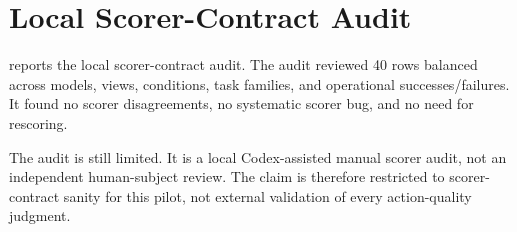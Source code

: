 \section{Local Scorer-Contract Audit}



 reports the local scorer-contract audit. The audit reviewed 40 rows balanced across models, views, conditions, task families, and operational successes/failures. It found no scorer disagreements, no systematic scorer bug, and no need for rescoring.

The audit is still limited. It is a local Codex-assisted manual scorer audit, not an independent human-subject review. The claim is therefore restricted to scorer-contract sanity for this pilot, not external validation of every action-quality judgment.
